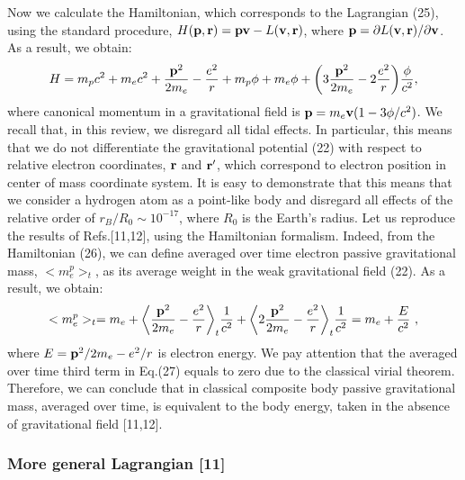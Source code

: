 \documentclass{ws-ijmpd}
\begin{document}
Now we calculate the Hamiltonian, which corresponds to the Lagrangian
(25), using the standard procedure, $H({\bf p},{\bf r})={\bf
p}{\bf v}-L({\bf v},{\bf r})$, where ${\bf p}= \partial L({\bf
v},{\bf r})/\partial {\bf v}$. As a result, we obtain:
\begin{equation}
H = m_p c^2 + m_e c^2 + \frac{{\bf p}^2}{2m_e}-\frac{e^2}{r} + m_p
\phi + m_e \phi + \biggl( 3 \frac{{\bf p}^2}{2 m_e}
-2\frac{e^2}{r} \biggl) \frac{\phi}{c^2},
\end{equation}
where canonical momentum in a gravitational field is ${\bf p}=m_e
{\bf v}(1-3\phi/c^2)$. We recall that, in this review, we
disregard all tidal effects. In particular, this means that we do
not differentiate the gravitational potential (22) with respect to
relative electron coordinates, ${\bf r}$ and ${\bf r'}$, which
correspond to electron position in center of mass coordinate
system. It is easy to demonstrate that this means that we consider
a hydrogen atom as a point-like body and disregard all effects of
the relative order of $r_B/R_0 \sim 10^{-17}$, where $R_0$ is the
Earth's radius. Let us reproduce the results of Refs.[11,12],
using the Hamiltonian formalism. Indeed, from the Hamiltonian
(26), we can define averaged over time electron passive
gravitational mass, $<m^p_e>_t$, as its average
 weight in the weak gravitational field (22). As a result, we obtain:
\begin{equation}
<m^p_e>_t = m_e  + \biggl<  \frac{{\bf p}^2}{2 m_e}-
\frac{e^2}{r}\biggl>_t \frac{1}{c^2} +\biggl< 2 \frac{{\bf p}^2}{2
m_e}-\frac{e^2}{r}\biggl>_t \frac{1}{c^2} =  m_e + \frac{E}{c^2} \
,
\end{equation}
where $E= {\bf p}^2/2 m_e - e^2/r$ is electron energy. We pay
attention that the averaged over time third term in Eq.(27) equals to
zero due to the classical virial theorem. Therefore, we can conclude that in classical
composite body passive gravitational mass, averaged over time, is
equivalent to the body energy, taken in the absence of
gravitational field [11,12].


\subsubsection{More general Lagrangian [11]}
\end{document}
